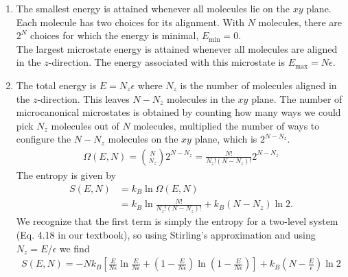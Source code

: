 \documentclass{article}
\theoremstyle{definition}
\newcommand{\f}[2]{\frac{#1}{#2}}
\newcommand{\lp}{\left(}
\newcommand{\rp}{\right)}
\newcommand{\lb}{\left[}
\newcommand{\rb}{\right]}
\begin{document}
\begin{enumerate}[label=(\alph*)]
	\item The smallest energy is attained whenever all molecules lie on the $xy$ plane. Each molecule has two choices for its alignment. With $N$ molecules, there are $\boxed{2^N}$ choices for which the  energy is minimal, $E_\text{min} = 0$. \\
	
	The largest microstate energy is attained whenever all molecules are aligned in the $z$-direction. The energy associated with this microstate is $\boxed{E_\text{max} = N\epsilon}$. 
	
	\item The total energy is $E = N_z \epsilon$ where $N_z$ is the number of molecules aligned in the $z$-direction. This leaves $N - N_z$ molecules in the $xy$ plane. The number of microcanonical microstates is obtained by counting how many ways we could pick $N_z$ molecules out of $N$ molecules, multiplied the number of ways to configure the $N-N_z$ molecules on the $xy$ plane, which is $2^{N-N_z}$.  
	\begin{align*}
	\Omega(E,N) = {N\choose {N_z}} 2^{N-N_z} = \boxed{\f{N!}{N_z! (N  - N_z)!}2^{N-N_z}}
	\end{align*}
	The entropy is given by 
	\begin{align*}
	S(E,N) 
	&= k_B \ln \Omega(E,N) \\
	&= k_B \ln \f{N!}{N_z! (N-N_z)!} + k_B (N-N_z) \ln 2.
	\end{align*}
	We recognize that the first term is simply the entropy for a two-level system (Eq. 4.18 in our textbook), so using Stirling's approximation and using $N_z = E/\epsilon$ we find 
	\begin{align*}
	\boxed{S(E,N) = -Nk_B \lb \f{E}{N\epsilon}  \ln \f{E}{N\epsilon} + \lp 1 - \f{E}{N\epsilon} \rp \ln \lp 1 - \f{E}{N\epsilon} \rp\rb  + k_B \lp N - \f{E}{\epsilon} \rp \ln 2}
	\end{align*}
	

\end{enumerate}
\end{document}
